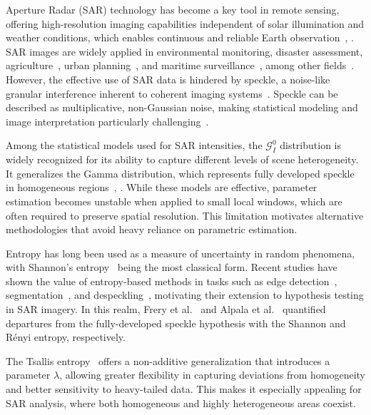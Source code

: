 \documentclass[
  lettersize  journal,
]{IEEEtran}%
\begin{document}
 Aperture Radar (SAR) technology has become a
key tool in remote sensing, offering high-resolution imaging
capabilities independent of solar illumination and weather conditions,
which enables continuous and reliable Earth
observation~,
. SAR images are widely applied in
environmental monitoring, disaster assessment,
agriculture~, urban
planning~,
and maritime
surveillance~,
among other fields~. However, the
effective use of SAR data is hindered by speckle, a noise-like granular
interference inherent to coherent imaging
systems~. Speckle can be described as
multiplicative, non-Gaussian noise, making statistical modeling and
image interpretation particularly
challenging~.

Among the statistical models used for SAR intensities, the
\(\mathcal{G}_I^0\) distribution is widely recognized for its ability to
capture different levels of scene heterogeneity. It generalizes the
Gamma distribution, which represents fully developed speckle in
homogeneous regions~,
. While these models are effective,
parameter estimation becomes unstable when applied to small local
windows, which are often required to preserve spatial resolution. This
limitation motivates alternative methodologies that avoid heavy reliance
on parametric estimation.

Entropy has long been used as a measure of uncertainty in random
phenomena, with Shannon's entropy~
being the most classical form. Recent studies have shown the value of
entropy-based methods in tasks such as edge
detection~,
segmentation~, and
despeckling~, motivating their
extension to hypothesis testing in SAR imagery. In this realm, Frery et
al.~ and Alpala et
al.~ quantified departures from the
fully-developed speckle hypothesis with the Shannon and Rényi entropy,
respectively.

The Tsallis entropy~ offers a
non-additive generalization that introduces a parameter \(\lambda\),
allowing greater flexibility in capturing deviations from homogeneity
and better sensitivity to heavy-tailed data. This makes it especially
appealing for SAR analysis, where both homogeneous and highly
heterogeneous areas coexist.
\end{document}
